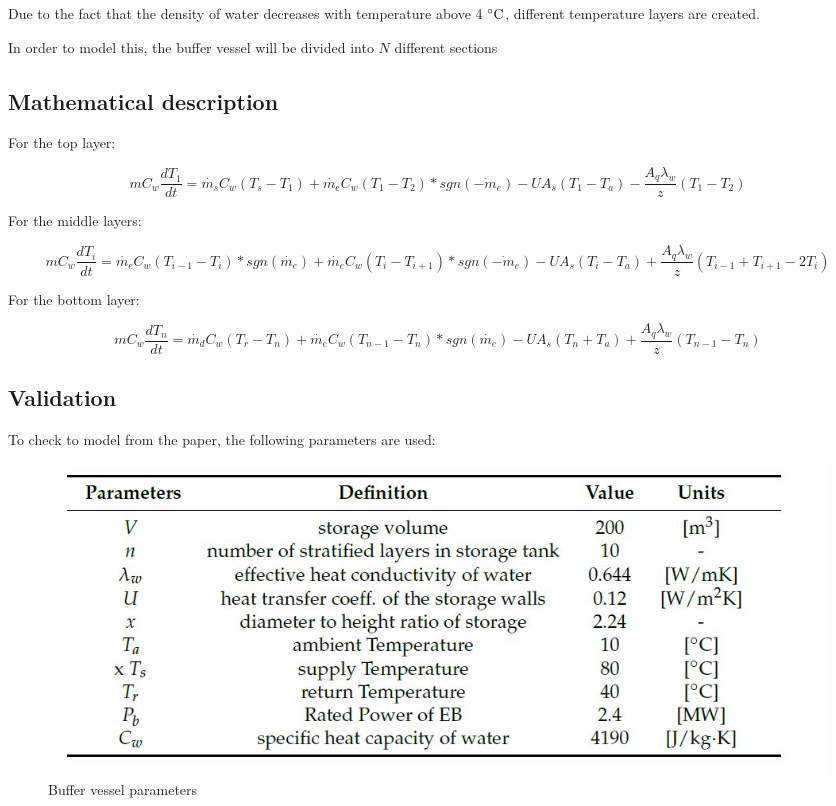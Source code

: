 Due to the fact that the density of water decreases with temperature above 4 $^\circ\mathrm{C}$, different temperature layers are created.

In order to model this, the buffer vessel will be divided into $N$ different sections 


\subsection{Mathematical description}

For the top layer:

\begin{equation}
	\label{eq:Buffer vessel top layer}
	mC_w \dfrac{dT_1}{dt} = \dot{m_s}C_w(T_s - T_1) + \dot{m_e}C_w(T_1 - T_2)*sgn(\dot{-m_e}) - UA_s(T_1 - T_a) - \frac{A_q\lambda_w}{z}(T_1-T_2)
\end{equation}

For the middle layers:

\begin{equation}
	\label{eq:Buffer vessel middle layers}
	mC_w \dfrac{dT_i}{dt} = \dot{m_e}C_w(T_{i-1} - T_{i})*sgn(\dot{m_e}) + \dot{m_e}C_w(T_{i} - T_{i+1})*sgn(\dot{-m_e}) - UA_s(T_i - T_a) + \frac{A_q\lambda_w}{z}(T_{i-1} + T_{i+1} - 2T_i)
\end{equation}

For the bottom layer:

\begin{equation}
	\label{eq:Buffer vessel bottom layer}
	mC_w \dfrac{dT_n}{dt} = \dot{m_d}C_w(T_r - T_n) + \dot{m_e}C_w(T_{n-1} - T_n)*sgn(\dot{m_e}) - UA_s(T_n + T_a) + \frac{A_q\lambda_w}{z}(T_{n-1}-T_n)
\end{equation}

\newpage

\subsection{Validation}

To check to model from the paper, the following parameters are used:

\begin{figure}[h]
	\centering
	\includegraphics[width=0.7\columnwidth]{Pictures/parameters_paper.JPG}
	\caption[Short title]{Buffer vessel parameters}
\end{figure}

